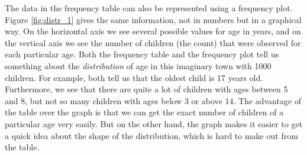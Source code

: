 \documentclass[]{book}\usepackage[]{graphicx}\usepackage[]{color}
\begin{document}
The data in the frequency table can also be represented using a frequency plot. Figure \ref{fig:distr_1} gives the same information, not in numbers but in a graphical way. On the horizontal axis we see several possible values for age in years, and on the vertical axis we see the number of children (the count) that were observed for each particular age. Both the frequency table and the frequency plot tell us something about the \textit{distribution} of age in this imaginary town with 1000 children. For example, both tell us that the oldest child is 17 years old. Furthermore, we see that there are quite a lot of children with ages between 5 and 8, but not so many children with ages below 3 or above 14. The advantage of the table over the graph is that we can get the exact number of children of a particular age very easily. But on the other hand, the graph makes it easier to get a quick idea about the shape of the distribution, which is hard to make out from the table.



\end{document}
